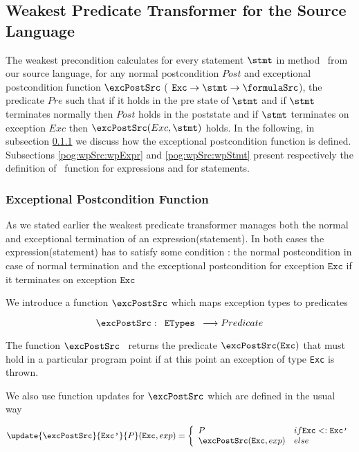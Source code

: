 
\subsection{Weakest Predicate Transformer for the Source Language } \label{pog:wpSrc}

The weakest precondition calculates for every statement $\stmt$ in method \methodd \ from our source language,
for any normal postcondition $Post$ and exceptional postcondition function $\excPostSrc$ ($ \mbox{ \rm \texttt{Exc}} \rightarrow \stmt \rightarrow \formulaSrc $),
 the predicate $Pre$ such that if it holds in the pre state of $\stmt$ and   if $\stmt$ terminates normally then $Post$ holds in the poststate and
 if $\stmt$ terminates on exception $Exc$ then $\excPostSrc(Exc, \stmt)$ holds. 
In the following, in  subsection   \ref{pog:wpSrc:excPost} we discuss how the exceptional postcondition function is defined.
Subsections \ref{pog:wpSrc:wpExpr} and  \ref{pog:wpSrc:wpStmt} present respectively
 the definition of \wpName \  function for expressions and for statements.  
 



\subsubsection{Exceptional Postcondition Function}\label{pog:wpSrc:excPost}

As we stated earlier the weakest predicate transformer manages both the normal and
 exceptional termination of  an expression(statement). 
In both cases the expression(statement) has to satisfy some condition : 
the normal postcondition in case of normal termination and the exceptional postcondition
for exception $\texttt{Exc}$ if it terminates on exception $\texttt{Exc}$


We introduce a function $\excPostSrc$  which maps exception types to predicates  

$$ \excPostSrc :  \mbox{\rm \texttt{ ETypes  }}  \longrightarrow   Predicate $$ 



The function $\excPostSrc$ \ returns the predicate $\excPostSrc (\texttt{Exc}) $ that must hold in a particular program point if
 at this point an exception of type \texttt{Exc} is thrown.





We also use  function updates for $\excPostSrc$ which are defined in the usual way


$$
\update{\excPostSrc}{\texttt{Exc'} }{ P }(\texttt{Exc}, exp)  = 
       \left\{\begin{array}{ll} 
         P & if \texttt{Exc} <: \texttt{Exc'}  \\
         \excPostSrc(\texttt{Exc}, exp ) & else 
     \end{array}\right.$$



